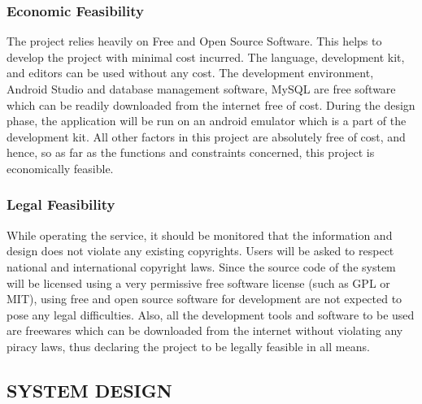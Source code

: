 \documentclass[12pt, a4paper]{article}
\begin{document}
\vspace{5mm}
\subsubsection{Economic Feasibility}

\vspace{5mm}
The project relies heavily on Free and Open Source Software. This helps to develop the project with minimal cost incurred. The language, development kit, and editors can be used without any cost. The development environment, Android Studio and database management software, MySQL are free software which can be readily downloaded from the internet free of cost. During the design phase, the application will be run on an android emulator which is a part of the development kit. All other factors in this project are absolutely free of cost, and hence, so as far as the functions and constraints concerned, this project is economically feasible.

\vspace{5mm}
\subsubsection{Legal Feasibility}

\vspace{5mm}
While operating the service, it should be monitored that the information and design does not violate any existing copyrights. Users will be asked to respect national and international  copyright laws. Since the source code of the system will be licensed using a very permissive free software license (such as GPL or MIT), using free and open source software for development are not expected to pose any legal difficulties. Also, all the development tools and software to be used are freewares which can be downloaded from the internet without violating any piracy laws, thus declaring the project to be legally feasible in all means.\\

\newpage
\begin{center}
\section{SYSTEM DESIGN}\vspace{5mm}
\end{center}
\end{document}
